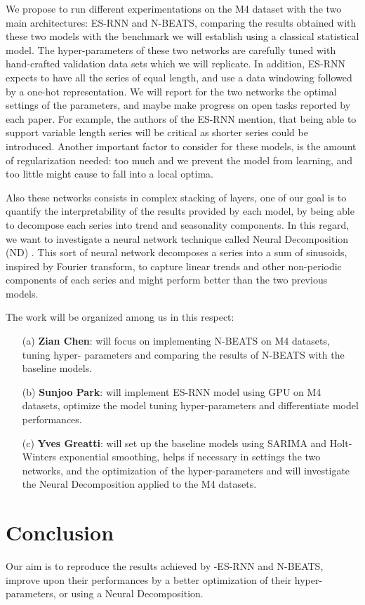 \documentclass{article}
\begin{document}
We propose to run different experimentations on the M4 dataset with the two main architectures: ES-RNN and N-BEATS, comparing the results obtained with these two models 
with the benchmark we will establish using a classical statistical model.
The hyper-parameters of these two networks are carefully tuned with hand-crafted validation data sets which we will replicate. 
In addition, ES-RNN expects to have all the series of equal length, and use a data windowing followed by a one-hot representation.
We will report for the two networks the optimal settings of the parameters, and maybe make progress on open tasks reported by each paper.
For example, the authors of the ES-RNN mention, that being able to support variable length series will be critical as shorter series could be introduced.
Another important factor to consider for these models, is the amount of regularization needed: too much and we prevent the model from learning, and too little might cause to fall into a local optima.

Also these networks consists in complex stacking of layers, one of our goal is to quantify the interpretability of the results provided 
by each model, by being able to decompose each series into trend and seasonality components. 
In this regard, we want to investigate a neural network technique called Neural Decomposition (ND) \cite{NeuralDecomposition}. This sort of neural network
decomposes a series into a sum of sinusoids, inspired by Fourier transform, to capture linear trends and other non-periodic components of each series and might perform better than the two previous models.

The work will be organized among us in this respect: 
\begin{itemize}
	\item[(a)] \textbf{Zian Chen}: will focus on implementing N-BEATS on M4 datasets, tuning hyper- parameters and comparing the results of N-BEATS with the baseline models.
	\item[(b)] \textbf{Sunjoo Park}: will implement ES-RNN model using GPU on M4 datasets, optimize the model tuning hyper-parameters and differentiate model performances.
	\item[(c)] \textbf{Yves Greatti}: will set up the baseline models using SARIMA and  Holt-Winters exponential smoothing, helps if necessary in settings the two networks, and the optimization of the hyper-parameters 
	and will investigate the Neural Decomposition applied to the M4 datasets.
\end{itemize}

\section{Conclusion}
Our aim is to reproduce the results achieved by -ES-RNN and N-BEATS, improve upon their performances by a better optimization of their hyper-parameters, or using a Neural Decomposition.
 

\end{document}
